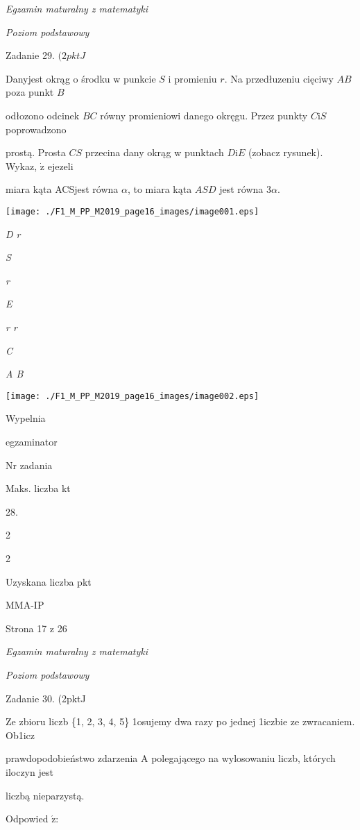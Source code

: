\documentclass[a4paper,12pt]{article}
\begin{document}
{\it Egzamin maturalny z matematyki}

{\it Poziom podstawowy}

Zadanie 29. $(2pktJ$

Danyjest okrąg o środku w punkcie $S$ i promieniu $r$. Na przedłuzeniu cięciwy $AB$ poza punkt $B$

odłozono odcinek $BC$ równy promieniowi danego okręgu. Przez punkty $C\mathrm{i}S$ poprowadzono

prostą. Prosta $CS$ przecina dany okrąg w punktach $D\mathrm{i}E$ (zobacz rysunek). Wykaz, $\dot{\mathrm{z}}$ ejezeli

miara kąta ACSjest równa $\alpha$, to miara kąta $ASD$ jest równa $3\alpha.$
\begin{center}
\texttt{[image: ./F1\_M\_PP\_M2019\_page16\_images/image001.eps]}
\end{center}
{\it D  r}

{\it S}

{\it r}

{\it E}

{\it r  r}

{\it C}

{\it A  B}
\begin{center}
\texttt{[image: ./F1\_M\_PP\_M2019\_page16\_images/image002.eps]}
\end{center}
Wypelnia

egzaminator

Nr zadania

Maks. liczba kt

28.

2

2

Uzyskana liczba pkt

MMA-IP

Strona 17 z 26





{\it Egzamin maturalny z matematyki}

{\it Poziom podstawowy}

Zadanie 30. (2pktJ

Ze zbioru liczb \{1, 2, 3, 4, 5\} 1osujemy dwa razy po jednej 1iczbie ze zwracaniem. Ob1icz

prawdopodobieństwo zdarzenia A polegającego na wylosowaniu liczb, których iloczyn jest

liczbą nieparzystą.

Odpowied $\acute{\mathrm{z}}$:
\end{document}
